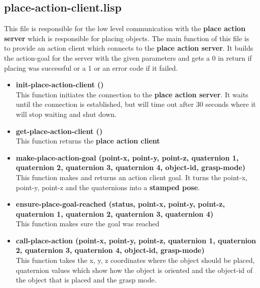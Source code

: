 \documentclass[main.tex]{subfiles}
\begin{document}
        \subsection{place-action-client.lisp}
        This file is responsible for the low level communication with the \textbf{place action server} which is responsible for placing objects. The main function of this file is to provide an action client which connects to the \textbf{place action server}. It builds the action-goal for the server with the given parameters and gets a 0 in return if placing was successful or a 1  or an error code if it failed. 
        \begin{itemize}
            \item \textbf{init-place-action-client ()} \\
            This function initiates the connection to the \textbf{place action server}. It waits until the connection is established, but will time out after 30 seconds where it will stop waiting and shut down. 
            \item \textbf{get-place-action-client ()} \\
            This function returns the \textbf{place action client}
            \item \textbf{make-place-action-goal (point-x, point-y, point-z, quaternion 1, quaternion 2, quaternion 3, quaternion 4, object-id, grasp-mode)} \\
            This function makes and returns an action client goal. It turns the point-x, point-y, point-z and the quaternions into a \textbf{stamped pose}.                
            \item \textbf{ensure-place-goal-reached (status, point-x, point-y, point-z, quaternion 1, quaternion 2, quaternion 3, quaternion 4)} \\
            This function makes sure the goal was reached
            \item \textbf{call-place-action (point-x, point-y, point-z, quaternion 1, quaternion 2, quaternion 3, quaternion 4, object-id, grasp-mode)} \\
            This function takes the x, y, z coordinates where the object should be placed, quaternion values which show how the object is oriented and the object-id of the object that is placed and the grasp mode.
        \end{itemize}
\end{document}
